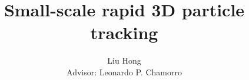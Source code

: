 \documentclass[draftthesis,fullpage]{uiucthesis}
\begin{document}
\title{Small-scale rapid 3D particle tracking}
\author{Liu Hong\\[1cm]{\small Advisor: Leonardo P. Chamorro}}
\phdthesis
{}

\maketitle

\frontmatter








\tableofcontents
\end{document}
